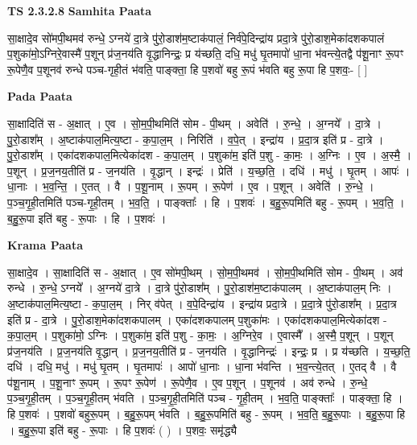 \documentclass[17pt]{extarticle}
\begin{document}
\textbf{TS 2.3.2.8 } \newline
\textbf{Samhita Paata} \newline

सा॒क्षादे॒व सो॑मपी॒थमव॑ रुन्धे॒ ऽग्नये॑ दा॒त्रे पु॑रो॒डाश॑म॒ष्टाक॑पालं॒ निर्व॑पे॒दिन्द्रा॑य प्रदा॒त्रे पु॑रो॒डाश॒मेका॑दशकपालं प॒शुका॑मो॒ऽग्निरे॒वास्मै॑ प॒शून् प्र॑ज॒नय॑ति वृ॒द्धानिन्द्रः॒ प्र य॑च्छति॒ दधि॒ मधु॑ घृ॒तमापो॑ धा॒ना भ॑वन्त्ये॒तद्वै प॑शू॒नाꣳ रू॒पꣳ रू॒पेणै॒व प॒शूनव॑ रुन्धे पञ्च-गृही॒तं भ॑वति॒ पाङ्क्ता॒ हि प॒शवो॑ बहु रू॒पं भ॑वति बहु रू॒पा हि प॒शवः॒-  [  ] \newline

\textbf{Pada Paata} \newline

सा॒क्षादिति॑ स - अ॒क्षात् । ए॒व । सो॒म॒पी॒थमिति॑ सोम - पी॒थम् । अवेति॑ । रु॒न्धे॒ । अ॒ग्नये᳚ । दा॒त्रे । पु॒रो॒डाश᳚म् । अ॒ष्टाक॑पाल॒मित्य॒ष्टा - क॒पा॒ल॒म् । निरिति॑ । व॒पे॒त् । इन्द्रा॑य । प्र॒दा॒त्र इति॑ प्र - दा॒त्रे । पु॒रो॒डाश᳚म् । एका॑दशकपाल॒मित्येका॑दश - क॒पा॒ल॒म् । प॒शुका॑म॒ इति॑ प॒शु - का॒मः॒ । अ॒ग्निः । ए॒व । अ॒स्मै॒ । प॒शून् । प्र॒ज॒नय॒तीति॑ प्र - ज॒नय॑ति । वृ॒द्धान् । इन्द्रः॑ । प्रेति॑ । य॒च्छ॒ति॒ । दधि॑ । मधु॑ । घृ॒तम् । आपः॑ । धा॒नाः । भ॒व॒न्ति॒ । ए॒तत् । वै । प॒शू॒नाम् । रू॒पम् । रू॒पेण॑ । ए॒व । प॒शून् । अवेति॑ । रु॒न्धे॒ । प॒ञ्च॒गृ॒ही॒तमिति॑ पञ्च-गृ॒ही॒तम् । भ॒व॒ति॒ । पाङ्क्ताः᳚ । हि । प॒शवः॑ । ब॒हु॒रू॒पमिति॑ बहु - रू॒पम् । भ॒व॒ति॒ । ब॒हु॒रू॒पा इति॑ बहु - रू॒पाः । हि । प॒शवः॑ ।  \newline


\textbf{Krama Paata} \newline

सा॒क्षादे॒व । सा॒क्षादिति॑ स - अ॒क्षात् । ए॒व सो॑मपी॒थम् । सो॒म॒पी॒थमव॑ । सो॒म॒पी॒थमिति॑ सोम - पी॒थम् । अव॑ रुन्धे । रु॒न्धे॒ ऽग्नये᳚ । अ॒ग्नये॑ दा॒त्रे । दा॒त्रे पु॑रो॒डाश᳚म् । पु॒रो॒डाश॑म॒ष्टाक॑पालम् । अ॒ष्टाक॑पाल॒म् निः । अ॒ष्टाक॑पाल॒मित्य॒ष्टा - क॒पा॒ल॒म् । निर् व॑पेत् । व॒पे॒दिन्द्रा॑य । इन्द्रा॑य प्रदा॒त्रे । प्र॒दा॒त्रे पु॑रो॒डाश᳚म् । प्र॒दा॒त्र इति॑ प्र - दा॒त्रे । पु॒रो॒डाश॒मेका॑दशकपालम् । एका॑दशकपालम् प॒शुका॑मः । एका॑दशकपाल॒मित्येका॑दश - क॒पा॒ल॒म् । प॒शुका॑मो॒ ऽग्निः । प॒शुका॑म॒ इति॑ प॒शु - का॒मः॒ । अ॒ग्निरे॒व । ए॒वास्मै᳚ । अ॒स्मै॒ प॒शून् । प॒शून् प्र॑ज॒नय॑ति । प्र॒ज॒नय॑ति वृ॒द्धान् । प्र॒ज॒नय॒तीति॑ प्र - ज॒नय॑ति । वृ॒द्धानिन्द्रः॑ । इन्द्रः॒ प्र । प्र य॑च्छति । य॒च्छ॒ति॒ दधि॑ । दधि॒ मधु॑ । मधु॑ घृ॒तम् । घृ॒तमापः॑ । आपो॑ धा॒नाः । धा॒ना भ॑वन्ति । भ॒व॒न्त्ये॒तत् । ए॒तद् वै । वै प॑शू॒नाम् । प॒शू॒नाꣳ रू॒पम् । रू॒पꣳ रू॒पेण॑ । रू॒पेणै॒व । ए॒व प॒शून् । प॒शूनव॑ । अव॑ रुन्धे । रु॒न्धे॒ प॒ञ्च॒गृ॒ही॒तम् । प॒ञ्च॒गृ॒ही॒तम् भ॑वति । प॒ञ्च॒गृ॒ही॒तमिति॑ पञ्च - गृ॒ही॒तम् । भ॒व॒ति॒ पाङ्क्ताः᳚ । पाङ्क्ता॒ हि । हि प॒शवः॑ । प॒शवो॑ बहुरू॒पम् । ब॒हु॒रू॒पम् भ॑वति । ब॒हु॒रू॒पमिति॑ बहु - रू॒पम् । भ॒व॒ति॒ ब॒हु॒रू॒पाः । ब॒हु॒रू॒पा हि । ब॒हु॒रू॒पा इति॑ बहु - रू॒पाः । हि प॒शवः॑ ( ) । प॒शवः॒ समृ॑द्ध्यै \newline
\end{document}
